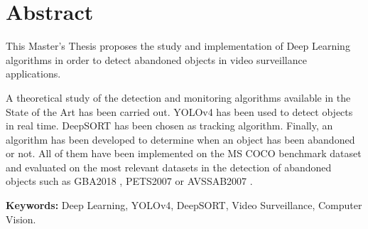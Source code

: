 
\chapter*{Abstract}
\label{cha:abstract}

\noindent
This Master's Thesis proposes the study and implementation of Deep Learning algorithms in order to detect abandoned objects in video surveillance applications.

A theoretical study of the detection and monitoring algorithms available in the State of the Art has been carried out. YOLOv4 \cite{bochkovskiy2020yolov4} has been used to detect objects in real time. DeepSORT \cite{Wojke2017simple} has been chosen as tracking algorithm. Finally, an algorithm has been developed to determine when an object has been abandoned or not. All of them have been implemented on the MS COCO \cite{lin2015microsoft} benchmark dataset and evaluated on the most relevant datasets in the detection of abandoned objects such as GBA2018 \cite{gba-dataset}, PETS2007 \cite{pets2007-dataset} or AVSSAB2007 \cite{AVSSAB2007-dataset}.

\textbf{Keywords:} Deep Learning, YOLOv4, DeepSORT, Video Surveillance, Computer Vision.